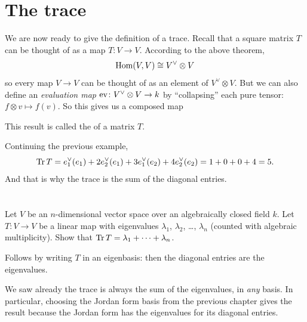 \section{The trace}
We are now ready to give the definition of a trace.
Recall that a square matrix $T$ can be thought of as a map $T \colon V \to V$.
According to the above theorem,
\[ \operatorname{Hom}(V, V) \cong V^\vee \otimes V \]
so every map $V \to V$ can be thought of as an element of $V^\vee \otimes V$.
But we can also define an
\emph{evaluation map} $\operatorname{ev} \colon V^\vee \otimes V \to k$
by ``collapsing'' each pure tensor: $f \otimes v \mapsto f(v)$.
So this gives us a composed map
\begin{center}
\end{center}
This result is called the  of a matrix $T$.

\begin{example}
	Continuing the previous example,
	\[ \operatorname{Tr} T = e_1^\vee(e_1) + 2e_2^\vee(e_1)
		+ 3e_1^\vee(e_2) + 4e_2^\vee(e_2)
		= 1 + 0 + 0 + 4 = 5. \]
	And that is why the trace is the sum of the diagonal entries.
\end{example}

\section{\problemhead}

\begin{problem}
	Let $V$ be an $n$-dimensional vector space
	over an algebraically closed field $k$.
	Let $T \colon V \to V$ be a linear map with
	eigenvalues $\lambda_1$, $\lambda_2$, \dots, $\lambda_n$
	(counted with algebraic multiplicity).
	Show that $\operatorname{Tr} T = \lambda_1 + \dots + \lambda_n$.
	\begin{hint}
		Follows by writing $T$ in an eigenbasis:
		then the diagonal entries are the eigenvalues.
	\end{hint}
	\begin{sol}
		We saw already the trace is always the sum of the eigenvalues, in \emph{any} basis.
		In particular, choosing the Jordan form basis from the previous chapter
		gives the result because the Jordan form has the eigenvalues for its diagonal entries.
	\end{sol}
\end{problem}


